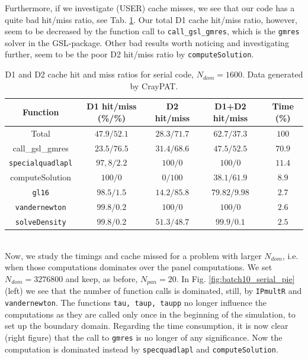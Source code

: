 \documentclass[a4paper,10pt]{article}
\def\code#1{\texttt{#1}}
\begin{document}
Furthermore, if we investigate (USER) cache misses, we see that our code has a quite bad hit/miss ratio, see Tab. \ref{tab:batch4_serial_caches}. Our total D1 cache hit/miss ratio, however, seem to be decreased by the function call to \texttt{call\_gsl\_gmres}, which is the \texttt{gmres} solver in the GSL-package. Other bad results worth noticing and investigating further, seem to be the poor D2 hit/miss ratio by \texttt{computeSolution}. 
\begin{table}[ht]
\begin{center}
    \begin{tabular}{ c | c | c | c | c }
        Function & D1 hit/miss (\%/\%) & D2 hit/miss & D1+D2 hit/miss & Time (\%) \\ \hline
        Total & $47.9/52.1$ & $28.3/71.7$ & $62.7/37.3$ & $100$ \\ 
        call\_gsl\_gmres & $23.5/76.5$ & $31.4/68.6$ & $47.5/52.5$ & $70.9$ \\
        \code{specialquadlapl} & $97,8/2.2$ & $100/0$ & $100/0$ & $11.4$ \\
        {computeSolution} & $100/0$ & $0/100$ & $38.1/61.9$ & $8.9$ \\
        \code{gl16} & $98.5/1.5$ & $14.2/85.8$ & $79.82/9.98$ & $2.7$ \\
        \code{vandernewton} & $99.8/0.2$ & $100/0$ & $100/0$ & $2.6$ \\
        \code{solveDensity} & $99.8/0.2$ & $51.3/48.7$ & $99.9/0.1$ & $2.5$
    \end{tabular}
    \caption{D1 and D2 cache hit and miss ratios for serial code, $N_{dom} = 1600$. Data generated by CrayPAT.}
    \label{tab:batch4_serial_caches}
\end{center}
\end{table}  \\
Now, we study the timings and cache missed for a problem with larger $N_{dom}$, i.e. when those computations dominates over the panel computations. We set $N_{dom} = 3276800$ and keep, as before, $N_{pan}=20$. In Fig. \ref{fig:batch10_serial_pie} (left) we see that the number of function calls is dominated, still, by \texttt{IPmultR} and \texttt{vandernewton}. The functions \texttt{tau, taup, taupp} no longer influence the computations as they are called only once in the beginning of the simulation, to set up the boundary domain. Regarding the time consumption, it is now clear (right figure) that the call to \texttt{gmres} is no longer of any significance. Now the computation is dominated instead by \texttt{specquadlapl} and \texttt{computeSolution}.
\end{document}
